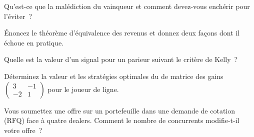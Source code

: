 \begin{interviewq}\label{iq:qm:games-auctions-and-information:2}
Qu'est-ce que la malédiction du vainqueur et comment devez-vous enchérir pour l'éviter~?
\end{interviewq}

\begin{interviewq}\label{iq:qm:games-auctions-and-information:3}
Énoncez le théorème d'équivalence des revenus et donnez deux façons dont il échoue en pratique.
\end{interviewq}

\begin{interviewq}\label{iq:qm:games-auctions-and-information:4}
Quelle est la valeur d'un signal pour un parieur suivant le critère de Kelly~?
\end{interviewq}

\begin{interviewq}\label{iq:qm:games-auctions-and-information:5}
Déterminez la valeur et les stratégies optimales du  de matrice des gains $\begin{pmatrix}3 & -1\\ -2 & 1\end{pmatrix}$ pour le joueur de ligne.
\end{interviewq}

\begin{interviewq}\label{iq:qm:games-auctions-and-information:6}
Vous soumettez une offre sur un portefeuille dans une demande de cotation (RFQ) face à quatre dealers. Comment le nombre de concurrents modifie-t-il votre offre~?
\end{interviewq}
